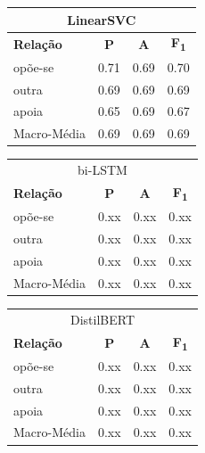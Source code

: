 \documentclass[a4paper, twocolumn, 11pt, twoside]{article}
\begin{document}
\begin{table}[!h]
    \begin{center}
    \begin{tabular}{l ccc}
		\multicolumn{4}{c}{LinearSVC}\\
		\hline
        {\bf Relação} & {\bf P} & {\bf A} & {\bf F\textsubscript{1}} \\
		\hline
        opõe-se          &  0.71  &  0.69  &  0.70   \\
        outra            &  0.69  &  0.69  &  0.69   \\
        apoia            &  0.65  &  0.69  &  0.67   \\
		\hline
		Macro-Média      &	0.69  &  0.69  &  0.69   \\
    \end{tabular}
	\end{center}
\end{table}


\begin{table}[!h]
    \begin{center}
    \begin{tabular}{l ccc}
		\multicolumn{4}{c}{bi-LSTM}\\
        {\bf Relação} & {\bf P} & {\bf A} & {\bf F\textsubscript{1}} \\
		\hline
        opõe-se          &  0.xx  &  0.xx  &  0.xx   \\
        outra            &  0.xx  &  0.xx  &  0.xx   \\
        apoia            &  0.xx  &  0.xx  &  0.xx   \\
		\hline
		Macro-Média      &  0.xx  &  0.xx  &  0.xx   \\
    \end{tabular}
	\end{center}
\end{table}


\begin{table}[!h]
    \begin{center}
    \begin{tabular}{l ccc}
		\multicolumn{4}{c}{DistilBERT}\\
        {\bf Relação} & {\bf P} & {\bf A} & {\bf F\textsubscript{1}} \\
		\hline
        opõe-se          &  0.xx  &  0.xx  &  0.xx   \\
        outra            &  0.xx  &  0.xx  &  0.xx   \\
        apoia            &  0.xx  &  0.xx  &  0.xx   \\
		\hline
		Macro-Média      &  0.xx  &  0.xx  &  0.xx   \\
    \end{tabular}
	\end{center}
\end{table}
\end{document}
